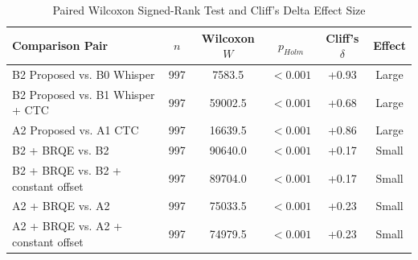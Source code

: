 \begin{table}[t]
\centering
\caption{Paired Wilcoxon Signed-Rank Test and Cliff's Delta Effect Size}
\label{tab:statistical_significance}
\begin{tabular}{lccccc}
\toprule
Comparison Pair & \(n\) & Wilcoxon \(W\) & \(p_{Holm}\) & Cliff's \(\delta\) & Effect \\
\midrule
B2 Proposed vs. B0 Whisper & 997 & 7583.5 & $< 0.001$ & +0.93 & Large \\
B2 Proposed vs. B1 Whisper + CTC & 997 & 59002.5 & $< 0.001$ & +0.68 & Large \\
A2 Proposed vs. A1 CTC & 997 & 16639.5 & $< 0.001$ & +0.86 & Large \\
B2 + BRQE vs. B2 & 997 & 90640.0 & $< 0.001$ & +0.17 & Small \\
B2 + BRQE vs. B2 + constant offset & 997 & 89704.0 & $< 0.001$ & +0.17 & Small \\
A2 + BRQE vs. A2 & 997 & 75033.5 & $< 0.001$ & +0.23 & Small \\
A2 + BRQE vs. A2 + constant offset & 997 & 74979.5 & $< 0.001$ & +0.23 & Small \\
\bottomrule
\end{tabular}
\end{table}
